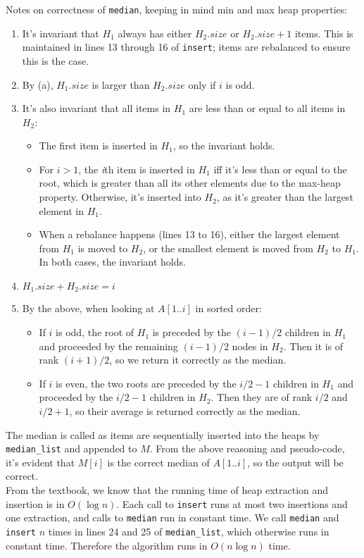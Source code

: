 \documentclass{article}
\begin{document}
\begin{enumerate}
\begin{lstlisting}
\end{lstlisting}
    Notes on correctness of \texttt{median}, keeping in mind min and max heap properties:
    \begin{enumerate}
        \item It's invariant that $H_1$ always has either $H_2.size$ or $H_2.size + 1$ items. This is maintained in lines 13 through 16 of \texttt{insert}; items are rebalanced to ensure this is the case.
        \item By (a), $H_1.size$ is larger than $H_2.size$ only if $i$ is odd.
        \item It's also invariant that all items in $H_1$ are less than or equal to all items in $H_2$:
            \begin{itemize}
            \item The first item is inserted in $H_1$, so the invariant holds.
            \item For $i > 1$, the \textit{i}th item is inserted in $H_1$ iff it's less than or equal to the root, which is greater than all its other elements due to the max-heap property. Otherwise, it's inserted into $H_2$, as it's greater than the largest element in $H_1$.
            \item When a rebalance happens (lines 13 to 16), either the largest element from $H_1$ is moved to $H_2$, or the smallest element is moved from $H_2$ to $H_1$. In both cases, the invariant holds.
            \end{itemize}
        \item $H_1.size + H_2.size = i$
        \item By the above, when looking at $A[1..i]$ in sorted order:
            \begin{itemize}
            \item If $i$ is odd, the root of $H_1$ is preceded by the $(i - 1) / 2$ children in $H_1$ and proceeded by the remaining $(i - 1) / 2$ nodes in $H_2$. Then it is of rank $(i + 1) / 2$, so we return it correctly as the median.
            \item If $i$ is even, the two roots are preceded by the $i / 2 - 1$ children in $H_1$ and proceeded by the $i / 2 - 1$ children in $H_2$. Then they are of rank $i / 2$ and $i / 2 + 1$, so their average is returned correctly as the median.
            \end{itemize}
    \end{enumerate}
    The median is called as items are sequentially inserted into the heaps by \texttt{median\_list} and appended to $M$. From the above reasoning and pseudo-code, it's evident that $M[i]$ is the correct median of $A[1..i]$, so the output will be correct. \\

    From the textbook, we know that the running time of heap extraction and insertion is in $O(\log n)$. Each call to \texttt{insert} runs at most two insertions and one extraction, and calls to \texttt{median} run in constant time. We call \texttt{median} and \texttt{insert} $n$ times in lines 24 and 25 of \texttt{median\_list}, which otherwise runs in constant time. Therefore the algorithm runs in $O(n \log n)$ time.

\end{enumerate}
\end{document}
